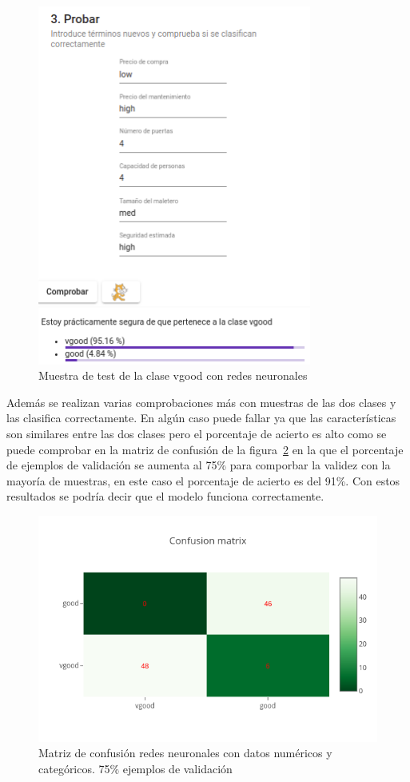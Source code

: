 \documentclass[a4paper, 12pt]{book}
\begin{document}
\begin{figure}
	\centering
	\includegraphics[width=9cm, keepaspectratio]{img/vgood_rn.png}
	\caption{Muestra de test de la clase vgood con redes neuronales} 	
	\label{fig:ejemplo21}
\end{figure}

Además se realizan varias comprobaciones más con muestras de las dos clases y las clasifica correctamente. En algún caso puede fallar ya que las características son similares entre las dos clases pero el porcentaje de acierto es alto como se puede comprobar en la matriz de confusión de la figura~\ref{fig:ejemplo22} en la que el porcentaje de ejemplos de validación se aumenta al 75\% para comporbar la validez con la mayoría de muestras, en este caso el porcentaje de acierto es del 91\%. Con estos resultados se podría decir que el modelo funciona correctamente.

\begin{figure}
	\centering
	\includegraphics[width=12cm, keepaspectratio]{img/cm_numycat_rn2.png}
	\caption{Matriz de confusión redes neuronales con datos numéricos y categóricos. 75\% ejemplos de validación} 	
	\label{fig:ejemplo22}
\end{figure}
\end{document}
